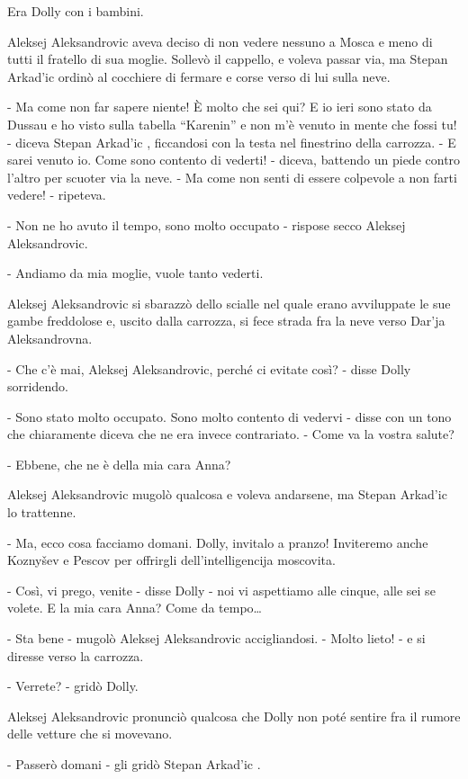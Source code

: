 Era Dolly con i bambini. 

Aleksej Aleksandrovic aveva deciso di non vedere nessuno a Mosca e meno di tutti il fratello di sua moglie. Sollevò il cappello, e voleva passar via, ma Stepan Arkad'ic ordinò al cocchiere di fermare e corse verso di lui sulla neve. 

- Ma come non far sapere niente! È molto che sei qui? E io ieri sono stato da Dussau e ho visto sulla tabella ``Karenin'' e non m'è venuto in mente che fossi tu! - diceva Stepan Arkad'ic , ficcandosi con la testa nel finestrino della carrozza. - E sarei venuto io. Come sono contento di vederti! - diceva, battendo un piede contro l'altro per scuoter via la neve. - Ma come non senti di essere colpevole a non farti vedere! - ripeteva. 

- Non ne ho avuto il tempo, sono molto occupato - rispose secco Aleksej Aleksandrovic. 

- Andiamo da mia moglie, vuole tanto vederti. 

Aleksej Aleksandrovic si sbarazzò dello scialle nel quale erano avviluppate le sue gambe freddolose e, uscito dalla carrozza, si fece strada fra la neve verso Dar'ja Aleksandrovna. 

- Che c'è mai, Aleksej Aleksandrovic, perché ci evitate così? - disse Dolly sorridendo. 

- Sono stato molto occupato. Sono molto contento di vedervi - disse con un tono che chiaramente diceva che ne era invece contrariato. - Come va la vostra salute? 

- Ebbene, che ne è della mia cara Anna? 

Aleksej Aleksandrovic mugolò qualcosa e voleva andarsene, ma Stepan Arkad'ic lo trattenne. 

- Ma, ecco cosa facciamo domani. Dolly, invitalo a pranzo! Inviteremo anche Koznyšev e Pescov per offrirgli dell'intelligencija moscovita. 

- Così, vi prego, venite - disse Dolly - noi vi aspettiamo alle cinque, alle sei se volete. E la mia cara Anna? Come da tempo\ldots{} 

- Sta bene - mugolò Aleksej Aleksandrovic accigliandosi. - Molto lieto! - e si diresse verso la carrozza. 

- Verrete? - gridò Dolly. 

Aleksej Aleksandrovic pronunciò qualcosa che Dolly non poté sentire fra il rumore delle vetture che si movevano. 

- Passerò domani - gli gridò Stepan Arkad'ic . 

